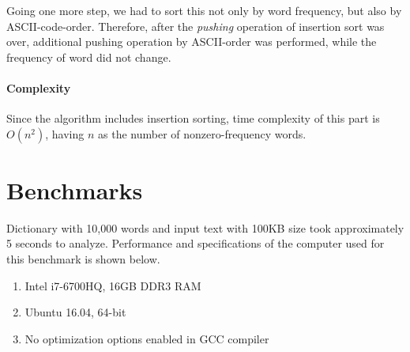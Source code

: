 \documentclass[11pt]{article}
\begin{document}
	Going one more step, we had to sort this not only by word frequency, but also by ASCII-code-order. Therefore, after the \textit{pushing} operation of insertion sort was over, additional pushing operation by ASCII-order was performed, while the frequency of word did not change.
	
	\paragraph{Complexity}
	Since the algorithm includes insertion sorting, time complexity of this part is $ O(n^2) $, having $ n $ as the number of nonzero-frequency words.
	\\
	
	\section{Benchmarks}
	Dictionary with 10,000 words and input text with 100KB size took approximately 5 seconds to analyze. Performance and specifications of the computer used for this benchmark is shown below.
	
	\begin{enumerate}
		\item Intel \textsuperscript{\textregistered} i7-6700HQ, 16GB DDR3 RAM
		\item Ubuntu 16.04, 64-bit
		\item No optimization options enabled in GCC compiler
	\end{enumerate}
\end{document}
